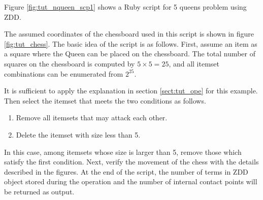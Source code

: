 Figure \ref{fig:tut_nqueen_scp1} shows a Ruby script for 5 queens problem using ZDD.

The assumed coordinates of the chessboard used in this script is shown in figure \ref{fig:tut_chess}. The basic idea of the script is as follows.
First, assume an item as a square where the Queen can be placed on the chessboard. The total number of squares on the chessboard is computed by $5\times 5=25$, and all itemset combinations can be enumerated from $2^{25}$.

It is sufficient to apply the explanation in section \ref{sect:tut_ope} for this example. Then select the itemset that meets the two conditions as follows. 

\begin{enumerate}
\item Remove all itemsets that may attack each other.
\item Delete the itemset with size less than 5.
\end{enumerate}

In this case, among itemsets whose size is larger than 5, remove those which satisfy the first condition. Next, verify the movement of the chess with the details described in the figures.
At the end of the script, the number of terms in ZDD object stored during the operation and the number of internal contact points will be returned as output.

